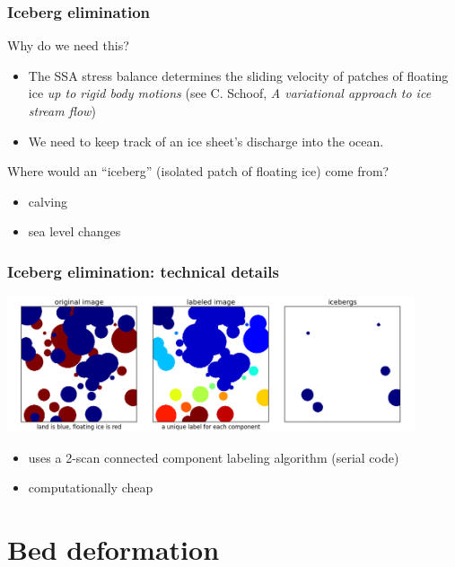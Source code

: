 \documentclass[hide notes,intlimits]{beamer}
\begin{document}
\begin{frame}
  \frametitle{Iceberg elimination}

  Why do we need this?

  \begin{itemize}
  \item The SSA stress balance determines the sliding velocity of
    patches of floating ice \emph{up to rigid body motions} (see C.
    Schoof, \emph{A variational approach to ice stream flow})
  \item We need to keep track of an ice sheet's discharge into the
    ocean.
  \end{itemize}

  Where would an ``iceberg'' (isolated patch of floating ice) come
  from?
  \begin{itemize}
  \item calving
  \item sea level changes
  \end{itemize}
\end{frame}

\begin{frame}
  \frametitle{Iceberg elimination: technical details}

  \begin{center}
    \includegraphics[width=0.9\textwidth]{icebergs.png}
  \end{center}

  \begin{itemize}
  \item uses a 2-scan connected component labeling algorithm (serial code)
  \item computationally cheap
  \end{itemize}
\end{frame}

\section{Bed deformation}
\label{sec:bed-deformation}
\end{document}
